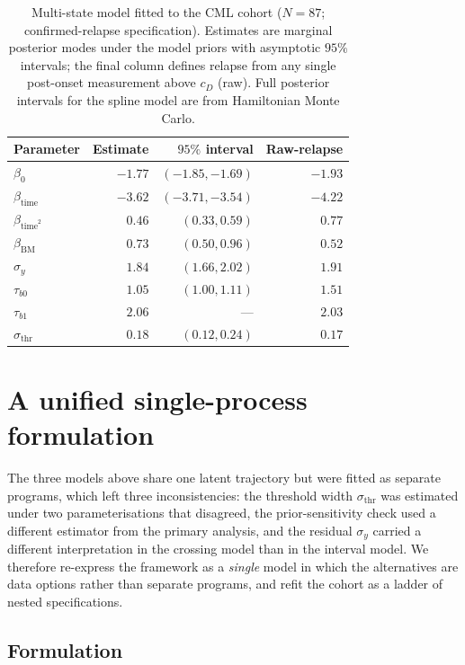\documentclass[11pt]{article}
\begin{document}
\begin{table}[!htbp]
\centering
\caption{Multi-state model fitted to the CML cohort ($N=87$; confirmed-relapse specification). Estimates are marginal posterior modes under the model priors with asymptotic $95\%$ intervals; the final column defines relapse from any single post-onset measurement above $c_D$ (raw). Full posterior intervals for the spline model are from Hamiltonian Monte Carlo.}
\label{tab:ms-real}
\small
\begin{tabular}{lrrr}
\toprule
Parameter & Estimate & $95\%$ interval & Raw-relapse\\
\midrule
$\beta_0$ & $-1.77$ & $(-1.85,-1.69)$ & $-1.93$\\
$\beta_{\mathrm{time}}$ & $-3.62$ & $(-3.71,-3.54)$ & $-4.22$\\
$\beta_{\mathrm{time}^2}$ & $0.46$ & $(0.33,0.59)$ & $0.77$\\
$\beta_{\mathrm{BM}}$ & $0.73$ & $(0.50,0.96)$ & $0.52$\\
$\sigma_y$ & $1.84$ & $(1.66,2.02)$ & $1.91$\\
$\tau_{b0}$ & $1.05$ & $(1.00,1.11)$ & $1.51$\\
$\tau_{b1}$ & $2.06$ & --- & $2.03$\\
$\sigma_{\mathrm{thr}}$ & $0.18$ & $(0.12,0.24)$ & $0.17$\\
\bottomrule
\end{tabular}
\end{table}

\section{A unified single-process formulation}
\label{sec:unified}

The three models above share one latent trajectory but were fitted as
separate programs, which left three inconsistencies: the threshold width
$\sigma_{\mathrm{thr}}$ was estimated under two parameterisations that
disagreed, the prior-sensitivity check used a different estimator from the
primary analysis, and the residual $\sigma_y$ carried a different
interpretation in the crossing model than in the interval model. We therefore
re-express the framework as a \emph{single} model in which the alternatives
are data options rather than separate programs, and refit the cohort as a
ladder of nested specifications.

\subsection{Formulation}
\end{document}
